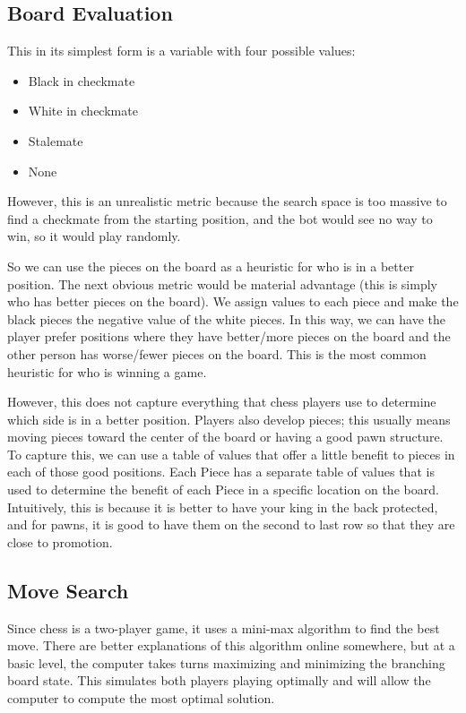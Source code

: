 \documentclass[sigconf]{acmart}
\begin{document}
\subsection{Board Evaluation}
This in its simplest form is a variable with four possible values:
\begin{itemize}
    \item Black in checkmate
    \item White in checkmate
    \item Stalemate
    \item None
\end{itemize}
However, this is an unrealistic metric because the search space is too massive to find a checkmate from the starting position, and the bot would see no way to win, so it would play randomly.

So we can use the pieces on the board as a heuristic for who is in a better position.
The next obvious metric would be material advantage (this is simply who has better pieces on the board).
We assign values to each piece and make the black pieces the negative value of the white pieces.
In this way, we can have the player prefer positions where they have better/more pieces on the board and the other person has worse/fewer pieces on the board.
This is the most common heuristic for who is winning a game.

However, this does not capture everything that chess players use to determine which side is in a better position.
Players also develop pieces; this usually means moving pieces toward the center of the board or having a good pawn structure.
To capture this, we can use a table of values that offer a little benefit to pieces in each of those good positions.
Each Piece has a separate table of values that is used to determine the benefit of each Piece in a specific location on the board.
Intuitively, this is because it is better to have your king in the back protected, and for pawns, it is good to have them on the second to last row so that they are close to promotion.

\subsection{Move Search}
Since chess is a two-player game, it uses a mini-max algorithm to find the best move.
There are better explanations of this algorithm online somewhere, but at a basic level, the computer takes turns maximizing and minimizing the branching board state.
This simulates both players playing optimally and will allow the computer to compute the most optimal solution.
\end{document}
